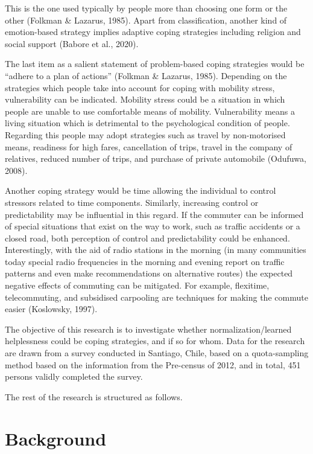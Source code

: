 \documentclass[
11pt, %
oneside, %
english, %
singlespacing, %
]{macthesis} %
\begin{document}
This is the one used typically by people more than choosing one form or the other (Folkman \& Lazarus, 1985). Apart from classification, another kind of emotion-based strategy implies adaptive coping strategies including religion and social support (Babore et al., 2020).

The last item as a salient statement of problem-based coping strategies would be ``adhere to a plan of actions'' (Folkman \& Lazarus, 1985). Depending on the strategies which people take into account for coping with mobility stress, vulnerability can be indicated. Mobility stress could be a situation in which people are unable to use comfortable means of mobility. Vulnerability means a living situation which is detrimental to the psychological condition of people. Regarding this people may adopt strategies such as travel by non-motorised means, readiness for high fares, cancellation of trips, travel in the company of relatives, reduced number of trips, and purchase of private automobile (Odufuwa, 2008).

Another coping strategy would be time allowing the individual to control stressors related to time components. Similarly, increasing control or predictability may be influential in this regard. If the commuter can be informed of special situations that exist on the way to work, such as traffic accidents or a closed road, both perception of control and predictability could be enhanced. Interestingly, with the aid of radio stations in the morning (in many communities today special radio frequencies in the morning and evening report on traffic patterns and even make recommendations on alternative routes) the expected negative effects of commuting can be mitigated. For example, flexitime, telecommuting, and subsidised carpooling are techniques for making the commute easier (Koslowsky, 1997).

The objective of this research is to investigate whether normalization/learned helplessness could be coping strategies, and if so for whom. Data for the research are drawn from a survey conducted in Santiago, Chile, based on a quota-sampling method based on the information from the Pre-census of 2012, and in total, 451 persons validly completed the survey.

The rest of the research is structured as follows.

\hypertarget{background-1}{%
\section{Background}\label{background-1}}
\end{document}
